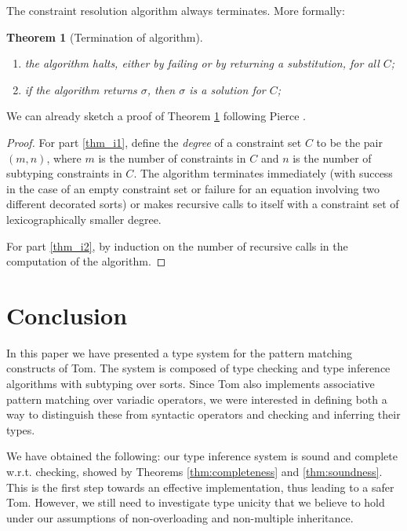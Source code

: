 \documentclass{eptcs}
\newcommand{\tom}{\textsf{Tom}\xspace}
\newcommand{\CC}{\ensuremath{C}\xspace}
\newtheorem{thm}{Theorem}[section]
\begin{document}
The constraint resolution algorithm always terminates. More formally:
\begin{thm}[Termination of algorithm] ~
\label{thm:termination}
\begin{enumerate}
\item \label{thm_i1} the algorithm halts, either by failing or by returning a
substitution, for all $\CC$;
\item \label{thm_i2}if the algorithm returns $\sigma$, then $\sigma$ is a solution for
$\CC$;
\end{enumerate} 
\end{thm}

We can already sketch a proof of Theorem \ref{thm:termination} following Pierce
\cite{pierce:02}.
\begin{proof}
For part \ref{thm_i1}, define the {\em degree} of a constraint set $\CC$ to be
the pair $(m,n)$, where $m$ is the number of constraints in $\CC$ and $n$ is the number
of subtyping constraints in $\CC$. The algorithm terminates immediately (with
success in the case of an empty constraint set or failure for an equation involving two
different decorated sorts) or makes recursive calls to itself with
a constraint set of lexicographically smaller degree.

For part \ref{thm_i2}, by induction on the number of recursive calls in the
computation of the algorithm.
\end{proof}



\section{Conclusion}
\label{sec:conclusion}

In this paper we have presented a type system for the pattern matching
constructs of \tom. The system is composed of type
checking and type inference algorithms with subtyping over sorts. Since \tom
also implements associative pattern matching over variadic operators, we were 
interested in defining both a way to distinguish these from syntactic
operators and checking and inferring their types.

We have obtained the following: our type inference system is sound and complete
w.r.t. checking, showed by Theorems \ref{thm:completeness} and \ref{thm:soundness}. This
is the first step towards an effective implementation, thus leading to a safer
\tom.
However, we still need to investigate type unicity that we believe to hold under our assumptions of non-overloading and non-multiple inheritance.
\end{document}
